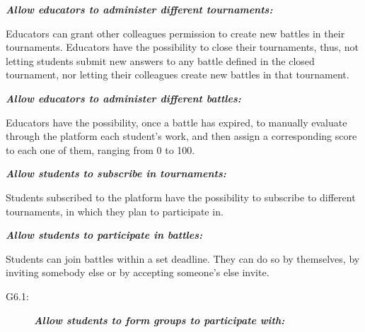 \documentclass{article}
\begin{document}
\begin{description}
\begin{description}
          \end{description}
    \item[G3:] \textit{\textbf{Allow educators to administer different tournaments:}}
          \begin{description}
              \item Educators can grant other colleagues permission to create new battles in their tournaments. Educators have the possibility to close their tournaments, thus, not letting students submit new answers to any battle defined in the closed tournament, nor letting their colleagues create new battles in that tournament.
          \end{description}
    \item[G4:] \textit{\textbf{Allow educators to administer different battles:}}
          \begin{description}
              \item Educators have the possibility, once a battle has expired, to manually evaluate through the platform each student's work, and then assign a corresponding score to each one of them, ranging from 0 to 100.
          \end{description}
    \item[G5:] \textbf{\textit{Allow students to subscribe in tournaments:}}
          \begin{description}
              \item Students subscribed to the platform have the possibility to subscribe to different tournaments, in which they plan to participate in.
          \end{description}
    \item[G6:] \textbf{\textit{Allow students to participate in battles:}}
          \begin{description}
              \item Students can join battles within a set deadline. They can do so by themselves, by inviting somebody else or by accepting someone's else invite.
                    \begin{description}
                        \item[G6.1:] \textbf{\textit{Allow students to form groups to participate with:}}
\end{description}
\end{description}
\end{description}
\end{document}
